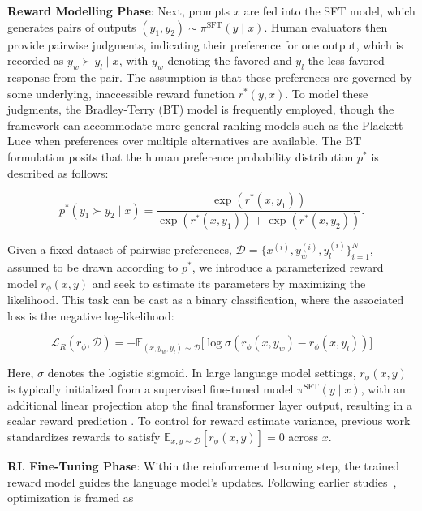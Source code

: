 \textbf{Reward Modelling Phase}: Next, prompts $x$ are fed into the SFT model, which generates pairs of outputs $(y_1, y_2)\sim \pi^\text{SFT}(y \mid x)$. Human evaluators then provide pairwise judgments, indicating their preference for one output, which is recorded as $y_w\succ y_l \mid x$, with $y_w$ denoting the favored and $y_l$ the less favored response from the pair. The assumption is that these preferences are governed by some underlying, inaccessible reward function $r^*(y, x)$. To model these judgments, the Bradley-Terry (BT) \cite{bradley1952rankanalysis} model is frequently employed, though the framework can accommodate more general ranking models such as the Plackett-Luce \citep{plackett1975analysis, luce2012individual} when preferences over multiple alternatives are available. The BT formulation posits that the human preference probability distribution $p^*$ is described as follows:

\begin{equation}\label{eq:bradley-terry}
    p^*(y_1\succ y_2 \mid x)=\frac{\exp\left(r^*(x, y_1)\right)}{\exp\left(r^*(x, y_1)\right) + \exp\left(r^*(x, y_2)\right)}.
\end{equation}

Given a fixed dataset of pairwise preferences, $\mathcal{D}=\bigl\{x^{(i)}, y_w^{(i)}, y_l^{(i)}\bigr\}_{i=1}^N$, assumed to be drawn according to $p^*$, we introduce a parameterized reward model $r_{\phi}(x, y)$ and seek to estimate its parameters by maximizing the likelihood. This task can be cast as a binary classification, where the associated loss is the negative log-likelihood:

\begin{equation}\label{eq:reward_model}
    \mathcal{L}_R(r_{\phi}, \mathcal{D}) = -\mathbb{E}_{(x, y_w, y_l)\sim \mathcal{D}}\bigl[\log \sigma(r_{\phi}(x, y_w)- r_{\phi}(x, y_l))\bigr]
\end{equation}

Here, $\sigma$ denotes the logistic sigmoid. In large language model settings, $r_{\phi}(x, y)$ is typically initialized from a supervised fine-tuned model $\pi^\text{SFT}(y \mid x)$, with an additional linear projection atop the final transformer layer output, resulting in a scalar reward prediction \cite{ziegler2020finetuning}. To control for reward estimate variance, previous work standardizes rewards to satisfy $\mathbb{E}_{x,y\sim \mathcal{D}}\left[r_\phi(x, y)\right] = 0$ across $x$.

\textbf{RL Fine-Tuning Phase}: Within the reinforcement learning step, the trained reward model guides the language model's updates. Following earlier studies~\citep{jaques2017sequence, jaques2020human}, optimization is framed as

